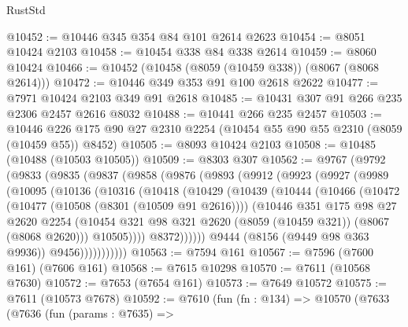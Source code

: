 \begin{lexlean}{RustStd}
\begin{coremodule}
@10452 := @10446 @345 @354 @84 @101 @2614 @2623
@10454 := @8051 @10424 @2103
@10458 := @10454 @338 @84 @338 @2614
@10459 := @8060 @10424
@10466 := @10452 (@10458 (@8059 (@10459 @338)) (@8067 (@8068 @2614)))
@10472 := @10446 @349 @353 @91 @100 @2618 @2622
@10477 := @7971 @10424 @2103 @349 @91 @2618
@10485 := @10431 @307 @91 @266 @235 @2306 @2457 @2616 @8032
@10488 := @10441 @266 @235 @2457
@10503 := @10446 @226 @175 @90 @27 @2310 @2254 (@10454 @55 @90 @55 @2310 (@8059 (@10459 @55)) @8452)
@10505 := @8093 @10424 @2103
@10508 := @10485 (@10488 (@10503 @10505))
@10509 := @8303 @307
@10562 := @9767
    (@9792
      (@9833
        (@9835
          (@9837
            (@9858
              (@9876
                (@9893
                  (@9912
                    (@9923
                      (@9927
                        (@9989
                          (@10095
                            (@10136
                              (@10316
                                (@10418
                                  (@10429
                                    (@10439
                                      (@10444
                                        (@10466
                                          (@10472
                                            (@10477 (@10508 (@8301 (@10509 @91 @2616))))
                                            (@10446
                                              @351
                                              @175
                                              @98
                                              @27
                                              @2620
                                              @2254
                                              (@10454
                                                @321
                                                @98
                                                @321
                                                @2620
                                                (@8059 (@10459 @321))
                                                (@8067 (@8068 @2620)))
                                              @10505))))
                                      @8372))))))
                          @9444
                          (@8156 (@9449 @98 @363 @9936))
                          @9456)))))))))))
@10563 := @7594 @161
@10567 := @7596 (@7600 @161) (@7606 @161)
@10568 := @7615 @10298
@10570 := @7611 (@10568 @7630)
@10572 := @7653 (@7654 @161)
@10573 := @7649 @10572
@10575 := @7611 (@10573 @7678)
@10592 := @7610
    (fun (fn : @134) =>
    @10570
      (@7633
        (@7636
          (fun (params : @7635) =>

\end{coremodule}
\end{lexlean}
